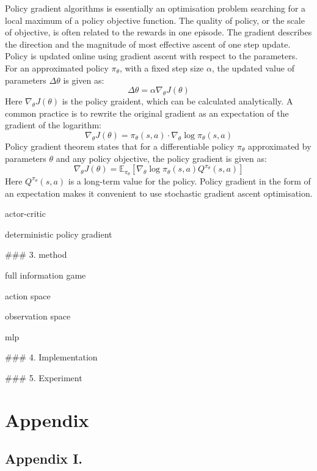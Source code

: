 \documentclass[twoside,12pt,a4paper]{article}
\begin{document}
Policy gradient algorithms is essentially an optimisation problem searching for a local maximum of a policy objective function. The quality of policy, or the scale of objective, is often related to the rewards in one episode. The gradient describes the direction and the magnitude of most effective ascent of one step update. Policy is updated online using gradient ascent with respect to the parameters. For an approximated policy $\pi_\theta$, with a fixed step size $\alpha$, the updated value of parameters $\Delta \theta$ is given as:
$$
\Delta\theta=\alpha\nabla_\theta J(\theta)
$$
Here $\nabla_\theta J(\theta)$ is the policy graident, which can be calculated analytically. A common practice is to rewrite the original gradient as an expectation of the gradient of the logarithm:
$$
\nabla_\theta J(\theta) = \pi_\theta(s,a)\cdot\nabla_\theta \log\pi_\theta(s,a)
$$
Policy gradient theorem states that for a differentiable policy $\pi_\theta$ approximated by parameters $\theta$ and any policy objective, the policy gradient is given as:
$$
\nabla_\theta J(\theta) = \mathbb E_{\pi_\theta}[\nabla_\theta\log\pi_\theta(s,a)Q^{\pi_\theta}(s,a)]
$$
Here $Q^{\pi_\theta}(s,a)$ is a long-term value for the policy. Policy gradient in the form of an expectation makes it convenient to use stochastic gradient ascent optimisation.

actor-critic



deterministic policy gradient



### 3. method

full information game

action space

observation space

mlp















### 4. Implementation





### 5. Experiment
\clearpage
\lhead{}\rhead{}
{}



\clearpage

\section{Appendix}
\subsection{Appendix I.}
\end{document}
